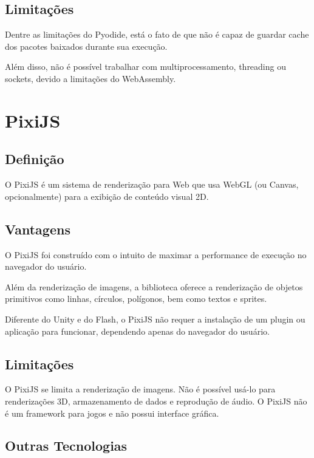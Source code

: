\begin{apendicesenv}
\subsection{Limitações}

Dentre as limitações do Pyodide, está o fato de que não é capaz de guardar cache dos pacotes baixados durante sua execução.

Além disso, não é possível trabalhar com multiprocessamento, threading ou sockets, devido a limitações do WebAssembly.

\section{PixiJS}

\subsection{Definição}

O PixiJS é um sistema de renderização para Web que usa WebGL (ou Canvas, opcionalmente) para a exibição de conteúdo visual 2D.

\subsection{Vantagens}

O PixiJS foi construído com o intuito de maximar a performance de execução no navegador do usuário.

Além da renderização de imagens, a biblioteca oferece a renderização de objetos primitivos como linhas, círculos, polígonos, bem como textos e sprites.

Diferente do Unity e do Flash, o PixiJS não requer a instalação de um plugin ou aplicação para funcionar, dependendo apenas do navegador do usuário.

\subsection{Limitações}

O PixiJS se limita a renderização de imagens. Não é possível usá-lo para renderizações 3D, armazenamento de dados e reprodução de áudio. O PixiJS não é um framework para jogos e não possui interface gráfica.


\subsection{Outras Tecnologias}


\end{apendicesenv}
